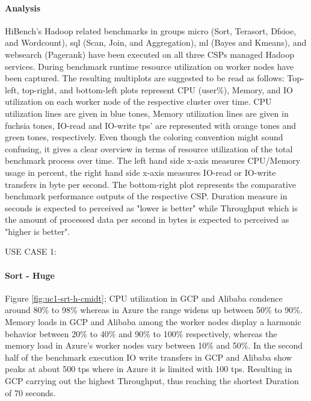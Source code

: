 \documentclass[review]{elsarticle}
\begin{document}
\paragraph{Analysis}HiBench's Hadoop related benchmarks in groups micro (Sort, Terasort, Dfsioe, and Wordcount), sql (Scan, Join, and Aggregation), ml (Bayes and Kmeans), and websearch (Pagerank) have been executed on all three CSPs managed Hadoop services. During benchmark runtime resource utilization on worker nodes have been captured. The resulting multiplots are suggested to be read as follows: Top-left, top-right, and bottom-left plots represent CPU (user\%), Memory, and IO utilization on each worker node of the respective cluster over time. CPU utilization lines are given in blue tones, Memory utilization lines are given in fuchsia tones, IO-read and IO-write tps' are represented with orange tones and green tones, respectively. Even though the coloring convention might sound confusing, it gives a clear overview in terms of resource utilization of the total benchmark process over time. The left hand side x-axis measures CPU/Memory usage in percent, the right hand side x-axis measures IO-read or IO-write transfers in byte per second. The bottom-right plot represents the comparative benchmark performance outputs of the respective CSP. Duration measure in seconds is expected to perceived as "lower is better" while Throughput which is the amount of processed data per second in bytes is expected to perceived as "higher is better".





USE CASE 1: 
\paragraph{Sort - Huge} Figure \ref{fig:uc1-srt-h-cmidt}; CPU utilization in GCP and Alibaba condence around 80\% to 98\% whereas in Azure the range widens up between 50\% to 90\%. Memory loads in GCP and Alibaba among the worker nodes display a harmonic behavior between 20\% to 40\% and 90\% to 100\% respectively, whereas the memory load in Azure's worker nodes vary between 10\% and 50\%. In the second half of the benchmark execution IO write transfers in GCP and Alibaba show peaks at about 500 tps where in Azure it is limited with 100 tps. Resulting in GCP carrying out the highest Throughput, thus reaching the shortest Duration of 70 seconds.
\end{document}
